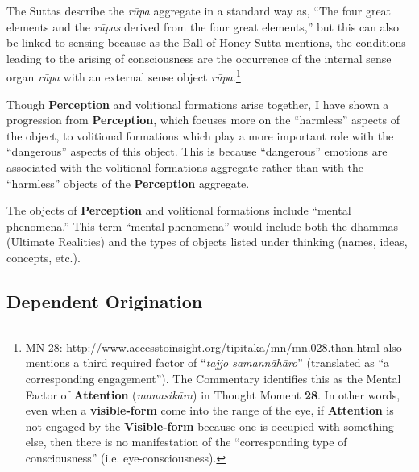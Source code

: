 The Suttas describe the \textit{rūpa} aggregate in a standard way as, “The four great elements and the \textit{rūpas} derived from the four great elements,” but this can also be linked to sensing because as the Ball of Honey Sutta mentions, the conditions leading to the arising of consciousness are the occurrence of the internal sense organ \textit{rūpa} with an external sense object \textit{rūpa}.\footnote{MN 28: \url{http://www.accesstoinsight.org/tipitaka/mn/mn.028.than.html} also mentions a third required factor of “\textit{tajjo samannāhāro}” (translated as “a corresponding engagement”). The Commentary identifies this as the Mental Factor of \textbf{Attention} (\textit{manasikāra}) in Thought Moment \textbf{28}. In other words, even when a \textbf{visible-form} come into the range of the eye, if \textbf{Attention} is not engaged by the \textbf{Visible-form} because one is occupied with something else, then there is no manifestation of the “corresponding type of consciousness” (i.e. eye-consciousness).}

Though \textbf{Perception} and volitional formations arise together, I have shown a progression from \textbf{Perception}, which focuses more on the “harmless” aspects of the object, to volitional formations which play a more important role with the “dangerous” aspects of this object. This is because “dangerous” emotions are associated with the volitional formations aggregate rather than with the “harmless” objects of the \textbf{Perception} aggregate.

The objects of \textbf{Perception} and volitional formations include “mental phenomena.” This term “mental phenomena” would include both the dhammas (Ultimate Realities) and the types of objects listed under thinking (names, ideas, concepts, etc.).

\subsection*{Dependent Origination}

